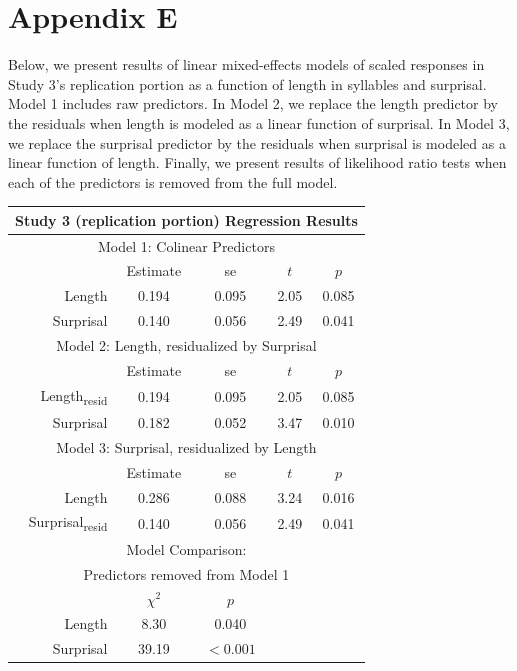 \section{Appendix E}


Below, we present results of linear mixed-effects models of scaled responses in Study 3's replication portion as a function of length in syllables and surprisal.
Model 1 includes raw predictors.
In Model 2, we replace the length predictor by the residuals when length is modeled as a linear function of surprisal.
In Model 3, we replace the surprisal predictor by the residuals when surprisal is modeled as a linear function of length.
Finally, we present results of likelihood ratio tests when each of the predictors is removed from the full model.

\vspace{4mm}

\noindent
\footnotesize{
\begin{tabular}{r|cccc}
\hline
\hline
\multicolumn{5}{c}{\textbf{Study 3 (replication portion) Regression Results}} \\
\hline
\hline
\multicolumn{5}{c}{Model 1: Colinear Predictors} \\
& Estimate & se & $t$ & $p$ \\
\hline
Length & 0.194 & 0.095 & 2.05 & 0.085 \\
Surprisal & 0.140 & 0.056 & 2.49 & 0.041 \\
\hline
\hline
\multicolumn{5}{c}{Model 2: Length, residualized by Surprisal} \\
& Estimate & se & $t$ & $p$ \\
\hline
Length\textsubscript{resid} & 0.194 & 0.095 & 2.05 & 0.085 \\
Surprisal & 0.182 & 0.052 & 3.47 & 0.010 \\
\hline
\hline
\multicolumn{5}{c}{Model 3: Surprisal, residualized by Length} \\
& Estimate & se & $t$ & $p$ \\
\hline
Length & 0.286 & 0.088 & 3.24 & 0.016 \\
Surprisal\textsubscript{resid} & 0.140 & 0.056 & 2.49 & 0.041 \\
\hline
\hline
\multicolumn{5}{c}{Model Comparison:} \\
\multicolumn{5}{c}{Predictors removed from Model 1} \\
& $\chi^2$ & $p$ \\
\hline
Length & 8.30 & 0.040 \\
Surprisal & 39.19 & $<0.001$ \\
\hline
\hline
\end{tabular}
}

